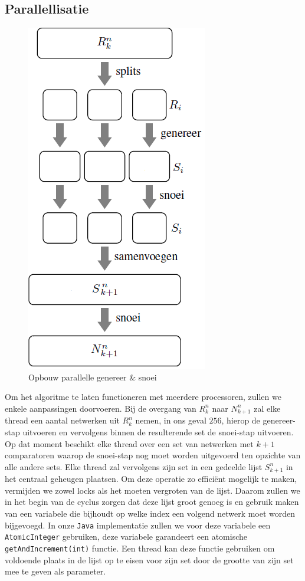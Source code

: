 \documentclass{article}
\begin{document}
\subsection{Parallellisatie}\label{Parallellisatie}
\begin{figure}
	\centering
	\includegraphics[scale=0.5]{Gen_Prune_Opbouw.png}
	\caption{Opbouw parallelle genereer \& snoei}
	\label{opbouwGenPrune}
\end{figure}
Om het algoritme te laten functioneren met meerdere processoren, zullen we enkele aanpassingen doorvoeren.
Bij de overgang van $R^n_k$ naar $N^n_{k+1}$ zal elke thread een aantal netwerken uit $R^n_k$ nemen, in ons geval $256$, hierop de genereer-stap uitvoeren en vervolgens binnen de resulterende set de snoei-stap uitvoeren.
Op dat moment beschikt elke thread over een set van netwerken met $k+1$ comparatoren waarop de snoei-stap nog moet worden uitgevoerd ten opzichte van alle andere sets.
Elke thread zal vervolgens zijn set in een gedeelde lijst $S^n_{k+1}$ in het centraal geheugen plaatsen.
Om deze operatie zo effici\"ent mogelijk te maken, vermijden we zowel locks als het moeten vergroten van de lijst. 
Daarom zullen we in het begin van de cyclus zorgen dat deze lijst groot genoeg is en gebruik maken van een variabele die bijhoudt op welke index een volgend netwerk moet worden bijgevoegd.
In onze \texttt{Java} implementatie zullen we voor deze variabele een \texttt{AtomicInteger} gebruiken, deze variabele garandeert een atomische \texttt{getAndIncrement(int)} functie.
Een thread kan deze functie gebruiken om voldoende plaats in de lijst op te eisen voor zijn set door de grootte van zijn set mee te geven als parameter.
\end{document}
